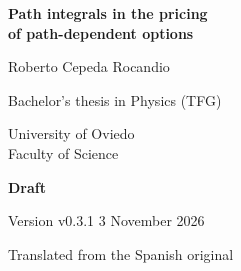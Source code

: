\documentclass[11pt,a4paper,oneside]{report}
\newcommand{\draftversion}{v0.3.1}
\newcommand{\draftdate}{3 November 2026}
\begin{document}
\begin{titlepage}
\centering
\vspace*{2cm}
{\LARGE\bfseries Path integrals in the pricing\\[0.3cm]
of path-dependent options\par}
\vspace{1.5cm}
{\Large Roberto Cepeda Rocandio\par}
\vspace{2.5cm}
{\large Bachelor's thesis in Physics (TFG)\par}
\vspace{0.4cm}
{\sc University of Oviedo}\\[0.2cm]
Faculty of Science
\vfill
{\large\bfseries Draft\par}
\vspace{0.3cm}
Version \draftversion{} \textperiodcentered{} \draftdate\par
\vspace{0.3cm}
{\small Translated from the Spanish original\par}
\end{titlepage}

\clearpage
{}
\tableofcontents

\clearpage
{}
\setcounter{page}{1}










\clearpage

\end{document}
